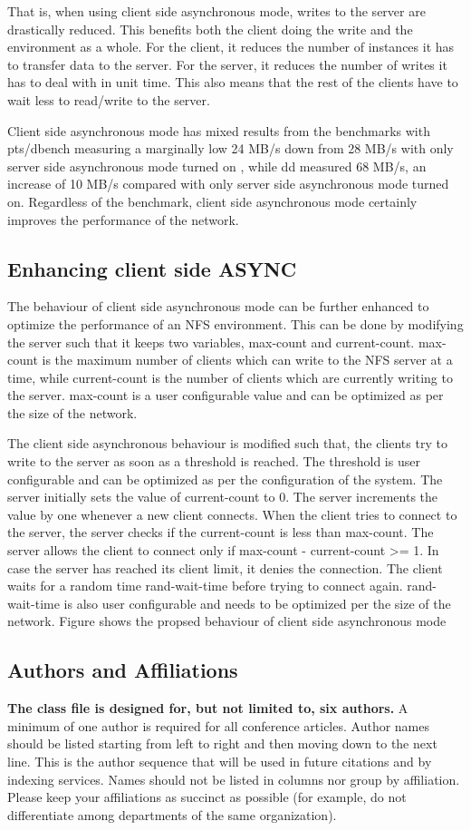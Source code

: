 \documentclass[conference]{IEEEtran}
\begin{document}
That is, when using client side asynchronous mode, writes to the server are
drastically reduced. This benefits both the client doing the write and the
environment as a whole. For the client, it reduces the number of instances
it has to transfer data to the server. For the server, it reduces the
number of writes it has to deal with in unit time. This also means that the
rest of the clients have to wait less to read/write to the server.

Client side asynchronous mode has mixed results from the benchmarks with
pts/dbench measuring a marginally low 24 MB/s down from 28 MB/s with only 
server side asynchronous mode turned on , while dd measured 68 MB/s, an 
increase of 10 MB/s compared with only server side asynchronous mode turned
on. Regardless of the benchmark, client side asynchronous mode certainly
improves the performance of the network.

\subsection{Enhancing client side ASYNC }\label{SCM}
The behaviour of client side asynchronous mode can be further enhanced to 
optimize the performance of an NFS environment. This can be done by
modifying the server such that it keeps two variables, max-count and 
current-count. max-count is the maximum number of clients which can write 
to the NFS server at a time, while current-count is the number of clients 
which are currently writing to the server. max-count is a user configurable
value and can be optimized as per the size of the network.

The client side asynchronous behaviour is modified such that, the clients 
try to write to the server as soon as a threshold is reached. The threshold
is user configurable and can be optimized as per the configuration of the
system. The server initially sets the value of current-count to 0. The 
server increments the value by one whenever a new client connects. When the
client tries to connect to the server, the server checks if the
current-count is less than max-count. The server allows the client to
connect only if max-count - current-count >= 1. In case the server has
reached its client limit, it denies the connection. The client waits for a
random time rand-wait-time before trying to connect again. rand-wait-time
is also user configurable and needs to be optimized per the size of the
network.
Figure shows the propsed behaviour of client side asynchronous mode
\subsection{Authors and Affiliations}
\textbf{The class file is designed for, but not limited to, six authors.} A 
minimum of one author is required for all conference articles. Author names 
should be listed starting from left to right and then moving down to the 
next line. This is the author sequence that will be used in future citations 
and by indexing services. Names should not be listed in columns nor group by 
affiliation. Please keep your affiliations as succinct as possible (for 
example, do not differentiate among departments of the same organization).
\end{document}
